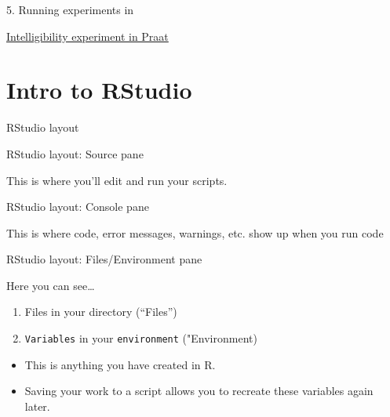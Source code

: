 \documentclass[
  ignorenonframetext,
]{beamer}
\providecommand{\tightlist}{%
  \setlength{\itemsep}{0pt}\setlength{\parskip}{0pt}}
\begin{document}
\begin{frame}{5. Running experiments in }
\protect\hypertarget{running-experiments-in}{}

\href{https://theaknowles.com/post/measuring-speech-intelligibility-in-praat-part1/}{Intelligibility
experiment in Praat}

\end{frame}

\hypertarget{intro-to-rstudio}{%
\section{Intro to RStudio}\label{intro-to-rstudio}}

\begin{frame}{RStudio layout}
\protect\hypertarget{rstudio-layout}{}

\end{frame}

\begin{frame}{RStudio layout: Source pane}
\protect\hypertarget{rstudio-layout-source-pane}{}

This is where you'll edit and run your scripts.

\end{frame}

\begin{frame}{RStudio layout: Console pane}
\protect\hypertarget{rstudio-layout-console-pane}{}

This is where code, error messages, warnings, etc. show up when you run
code

\end{frame}

\begin{frame}[fragile]{RStudio layout: Files/Environment pane}
\protect\hypertarget{rstudio-layout-filesenvironment-pane}{}

Here you can see\ldots{}

\begin{enumerate}
\tightlist
\item
  Files in your directory (``Files'')
\item
  \texttt{Variables} in your \texttt{environment} ("Environment)
\end{enumerate}

\begin{itemize}
\tightlist
\item
  This is anything you have created in R.
\item
  Saving your work to a script allows you to recreate these variables
  again later.
\end{itemize}

\end{frame}
\end{document}
